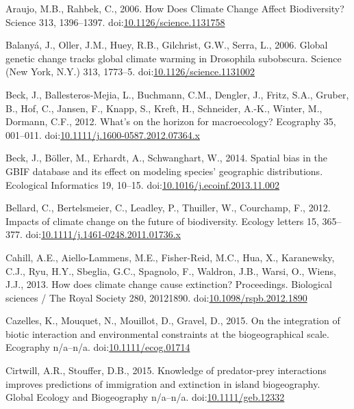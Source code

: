 \hypertarget{ref-Araujo2006}{}
Araujo, M.B., Rahbek, C., 2006. How Does Climate Change Affect
Biodiversity? Science 313, 1396--1397.
doi:\href{https://doi.org/10.1126/science.1131758}{10.1126/science.1131758}

\hypertarget{ref-Balanya2006}{}
Balanyá, J., Oller, J.M., Huey, R.B., Gilchrist, G.W., Serra, L., 2006.
Global genetic change tracks global climate warming in Drosophila
subobscura. Science (New York, N.Y.) 313, 1773--5.
doi:\href{https://doi.org/10.1126/science.1131002}{10.1126/science.1131002}

\hypertarget{ref-Beck2012}{}
Beck, J., Ballesteros-Mejia, L., Buchmann, C.M., Dengler, J., Fritz,
S.A., Gruber, B., Hof, C., Jansen, F., Knapp, S., Kreft, H., Schneider,
A.-K., Winter, M., Dormann, C.F., 2012. What's on the horizon for
macroecology? Ecography 35, 001--011.
doi:\href{https://doi.org/10.1111/j.1600-0587.2012.07364.x}{10.1111/j.1600-0587.2012.07364.x}

\hypertarget{ref-Beck2014a}{}
Beck, J., Böller, M., Erhardt, A., Schwanghart, W., 2014. Spatial bias
in the GBIF database and its effect on modeling species' geographic
distributions. Ecological Informatics 19, 10--15.
doi:\href{https://doi.org/10.1016/j.ecoinf.2013.11.002}{10.1016/j.ecoinf.2013.11.002}

\hypertarget{ref-Bellard2012}{}
Bellard, C., Bertelsmeier, C., Leadley, P., Thuiller, W., Courchamp, F.,
2012. Impacts of climate change on the future of biodiversity. Ecology
letters 15, 365--377.
doi:\href{https://doi.org/10.1111/j.1461-0248.2011.01736.x}{10.1111/j.1461-0248.2011.01736.x}

\hypertarget{ref-Cahill2013}{}
Cahill, A.E., Aiello-Lammens, M.E., Fisher-Reid, M.C., Hua, X.,
Karanewsky, C.J., Ryu, H.Y., Sbeglia, G.C., Spagnolo, F., Waldron, J.B.,
Warsi, O., Wiens, J.J., 2013. How does climate change cause extinction?
Proceedings. Biological sciences / The Royal Society 280, 20121890.
doi:\href{https://doi.org/10.1098/rspb.2012.1890}{10.1098/rspb.2012.1890}

\hypertarget{ref-Cazelles2015b}{}
Cazelles, K., Mouquet, N., Mouillot, D., Gravel, D., 2015. On the
integration of biotic interaction and environmental constraints at the
biogeographical scale. Ecography n/a--n/a.
doi:\href{https://doi.org/10.1111/ecog.01714}{10.1111/ecog.01714}

\hypertarget{ref-Cirtwill2015}{}
Cirtwill, A.R., Stouffer, D.B., 2015. Knowledge of predator-prey
interactions improves predictions of immigration and extinction in
island biogeography. Global Ecology and Biogeography n/a--n/a.
doi:\href{https://doi.org/10.1111/geb.12332}{10.1111/geb.12332}

